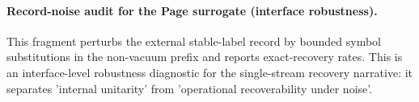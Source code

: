 \paragraph{Record-noise audit for the Page surrogate (interface robustness).} \AuditTag This fragment perturbs the external stable-label record by bounded symbol substitutions in the non-vacuum prefix and reports exact-recovery rates. This is an interface-level robustness diagnostic for the single-stream recovery narrative: it separates 'internal unitarity' from 'operational recoverability under noise'.